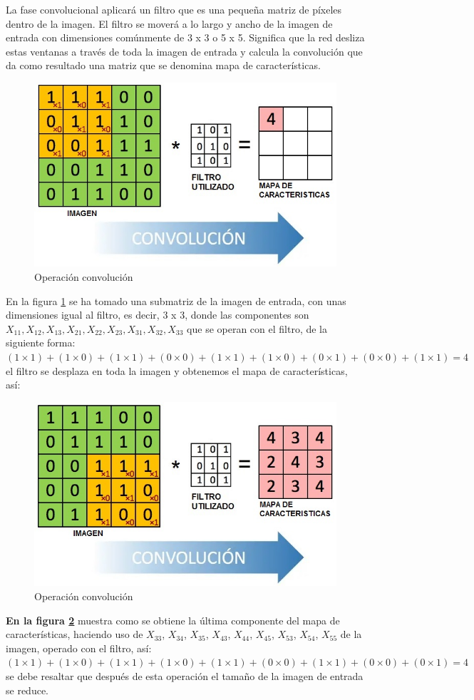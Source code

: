 \begin{itemize}
La fase convolucional aplicar\'a un filtro que es una pequeña matriz de píxeles dentro de la imagen. El filtro se moverá a lo largo y ancho de la imagen de entrada con dimensiones comúnmente de 3 x 3 o 5 x 5. Significa que la red desliza estas ventanas a través de toda la imagen de entrada y calcula la convolución que da como resultado una matriz que se denomina mapa de características.

\begin{figure}[H]
\centering
\includegraphics[width=0.5\linewidth]{imagenes/OPERACION_1.jpg}
\caption{Operación convolución}
\label{fig:OPERACION_1}
\end{figure}

En la figura \ref{fig:OPERACION_1} se ha tomado una submatriz de la imagen de entrada, con unas dimensiones igual al filtro, es decir, 3 x 3, donde las componentes son $X_{11}, X_{12}, X_{13}, X_{21}, X_{22}, X_{23}, X_{31}, X_{32}, X_{33}$ que se operan con el filtro, de la siguiente forma: $(1\times1) + (1\times0) + (1\times1) + (0\times0) + (1\times1) + (1\times0) + (0\times1) + (0\times0) + (1\times1) = 4 $ el filtro se desplaza en toda la imagen y obtenemos el mapa de características, así: 

\begin{figure}[H]
\centering
\includegraphics[width=0.4\linewidth]{imagenes/OPERACION_2.jpg}
\caption{Operación convolución}
\label{fig:OPERACION_2}
\end{figure}

\textbf{En la figura \ref{fig:OPERACION_2}} muestra como se obtiene la última componente del mapa de características, haciendo uso de $X_{33}$, $X_{34}$, $X_{35}$, $X_{43}$, $X_{44}$, $X_{45}$, $X_{53}$, $X_{54}$, $X_{55}$ de la imagen,  operado con el filtro, así: $(1\times1) + (1\times0) + (1\times1) + (1\times0) + (1\times1) + (0\times0) + (1\times1) + (0\times0) + (0\times1) = 4 $ se debe resaltar que después de esta operación el tamaño de la imagen de entrada se reduce.



\end{itemize}
